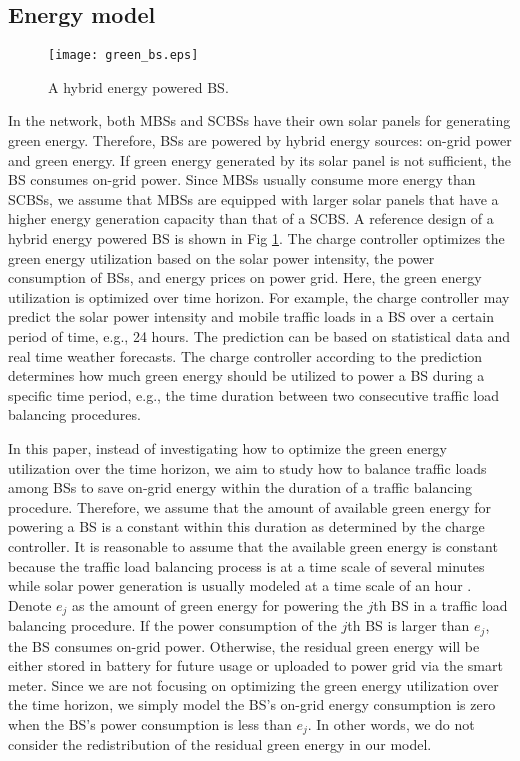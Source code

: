 \documentclass[journal]{IEEEtran}
\theoremstyle{definition}
\begin{document}
\subsection{Energy model}
\begin{figure}
\centering
\texttt{[image: green\_bs.eps]}
\caption{A hybrid energy powered BS.}
\label{fig:green_bs}
\vspace{-16pt}
\end{figure}
In the network, both MBSs and SCBSs have their own solar panels for generating green energy. Therefore, BSs are powered by hybrid energy sources: on-grid power and green energy. If green energy generated by its solar panel is not sufficient, the BS consumes on-grid power. Since MBSs usually consume more energy than SCBSs, we assume that MBSs are equipped with larger solar panels that have a higher energy generation capacity than that of a SCBS. A reference design of a hybrid energy powered BS \cite{Han:2014:PMN} is shown in Fig \ref{fig:green_bs}. The charge controller optimizes the green energy utilization based on the solar power intensity, the power consumption of BSs, and energy prices on power grid. Here, the green energy utilization is optimized over time horizon. For example, the charge controller may predict the solar power intensity and mobile traffic loads in a BS over a certain period of time, e.g., 24 hours. The prediction can be based on statistical data and real time weather forecasts. The charge controller according to the prediction determines how much green energy should be utilized to power a BS during a specific time period, e.g., the time duration between two consecutive traffic load balancing procedures.

In this paper, instead of investigating how to optimize the green energy utilization over the time horizon, we aim to study how to balance traffic loads among BSs to save on-grid energy within the duration of a traffic balancing procedure. Therefore, we assume that the amount of available green energy for powering a BS is a constant within this duration as determined by the charge controller. It is reasonable to assume that the available green energy is constant because the traffic load balancing process is at a time scale of several minutes \cite{Kim:2012:DOU} while solar power generation is usually modeled at a time scale of an hour \cite{Farbod:2007:RAO}. Denote $e_{j}$ as the amount of green energy for powering the $j$th BS in a traffic load balancing procedure. If the power consumption of the $j$th BS is larger than $e_{j}$, the BS consumes on-grid power. Otherwise, the residual green energy will be either stored in battery for future usage or uploaded to power grid via the smart meter. Since we are not focusing on optimizing the green energy utilization over the time horizon, we simply model the BS's on-grid energy consumption is zero when the BS's power consumption is less than $e_{j}$. In other words, we do not consider the redistribution of the residual green energy in our model.
\end{document}
